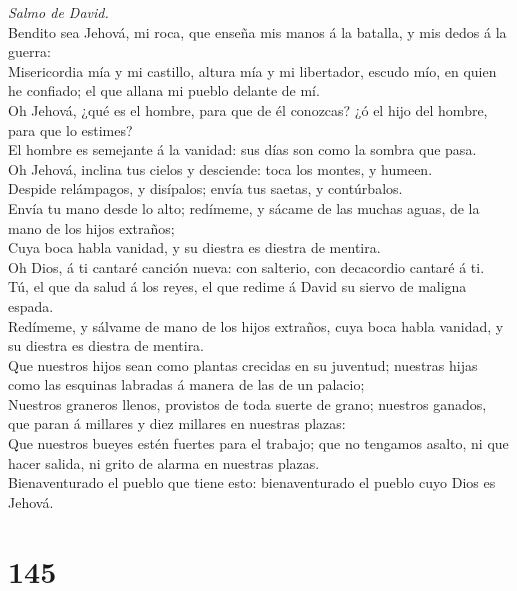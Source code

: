  \emph{Salmo de David.}\\
Bendito sea Jehová, mi roca, que enseña mis manos á la batalla, y mis
dedos á la guerra:\\
 Misericordia mía y mi castillo, altura mía y mi libertador,
escudo mío, en quien he confiado; el que allana mi pueblo delante de
mí.\\
 Oh Jehová, ¿qué es el hombre, para que de él conozcas? ¿ó
el hijo del hombre, para que lo estimes?\\
 El hombre es semejante á la vanidad: sus días son como la
sombra que pasa.\\
 Oh Jehová, inclina tus cielos y desciende: toca los montes,
y humeen.\\
 Despide relámpagos, y disípalos; envía tus saetas, y
contúrbalos.\\
 Envía tu mano desde lo alto; redímeme, y sácame de las
muchas aguas, de la mano de los hijos extraños;\\
 Cuya boca habla vanidad, y su diestra es diestra de
mentira.\\
 Oh Dios, á ti cantaré canción nueva: con salterio, con
decacordio cantaré á ti.\\
 Tú, el que da salud á los reyes, el que redime á David su
siervo de maligna espada.\\
 Redímeme, y sálvame de mano de los hijos extraños, cuya
boca habla vanidad, y su diestra es diestra de mentira.\\
 Que nuestros hijos sean como plantas crecidas en su
juventud; nuestras hijas como las esquinas labradas á manera de las de
un palacio;\\
 Nuestros graneros llenos, provistos de toda suerte de
grano; nuestros ganados, que paran á millares y diez millares en
nuestras plazas:\\
 Que nuestros bueyes estén fuertes para el trabajo; que no
tengamos asalto, ni que hacer salida, ni grito de alarma en nuestras
plazas.\\
 Bienaventurado el pueblo que tiene esto: bienaventurado el
pueblo cuyo Dios es Jehová.

\hypertarget{section-144}{%
\section{145}\label{section-144}}


